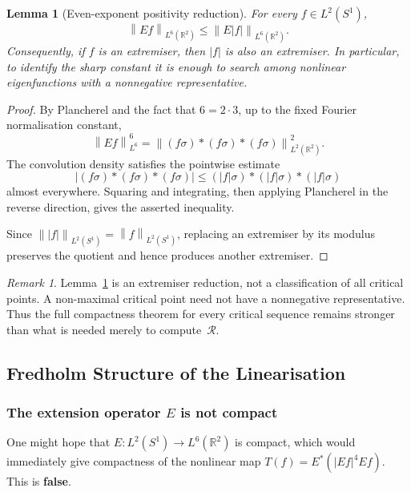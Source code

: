 \documentclass[12pt]{article}
\newtheorem{lemma}[theorem]{Lemma}
\theoremstyle{definition}
\theoremstyle{remark}
\newtheorem{remark}[theorem]{Remark}
\newcommand{\R}{\mathbb{R}}
\newcommand{\abs}[1]{\left|#1\right|}
\newcommand{\norm}[1]{\left\|#1\right\|}
\begin{document}
\begin{lemma}[Even-exponent positivity reduction]
  \label{lem:positive-reduction}
  For every $f\in L^2(S^1)$,
  \[
    \norm{Ef}_{L^6(\R^2)} \leq \norm{E|f|}_{L^6(\R^2)}.
  \]
  Consequently, if $f$ is an extremiser, then $|f|$ is also an extremiser.
  In particular, to identify the sharp constant it is enough to search
  among nonlinear eigenfunctions with a nonnegative representative.
\end{lemma}

\begin{proof}
  By Plancherel and the fact that $6=2\cdot 3$, up to the fixed Fourier
  normalisation constant,
  \[
    \norm{Ef}_{L^6}^6
    = \norm{(f\sigma)*(f\sigma)*(f\sigma)}_{L^2(\R^2)}^2 .
  \]
  The convolution density satisfies the pointwise estimate
  \[
    \abs{(f\sigma)*(f\sigma)*(f\sigma)}
    \leq (|f|\sigma)*(|f|\sigma)*(|f|\sigma)
  \]
  almost everywhere.  Squaring and integrating, then applying Plancherel
  in the reverse direction, gives the asserted inequality.

  Since $\norm{|f|}_{L^2(S^1)}=\norm{f}_{L^2(S^1)}$, replacing an
  extremiser by its modulus preserves the quotient and hence produces
  another extremiser.
\end{proof}

\begin{remark}
  Lemma~\ref{lem:positive-reduction} is an extremiser reduction, not a
  classification of all critical points.  A non-maximal critical point need
  not have a nonnegative representative.  Thus the full compactness theorem
  for every critical sequence remains stronger than what is needed merely
  to compute~$\mathcal R$.
\end{remark}


\subsection{Fredholm Structure of the Linearisation}
\label{sec:fredholm}

\subsubsection{The extension operator $E$ is not compact}

One might hope that $E:L^2(S^1)\to L^6(\R^2)$ is compact, which would
immediately give compactness of the nonlinear map $T(f)=E^*(|Ef|^4Ef)$.
This is \textbf{false}.
\end{document}
